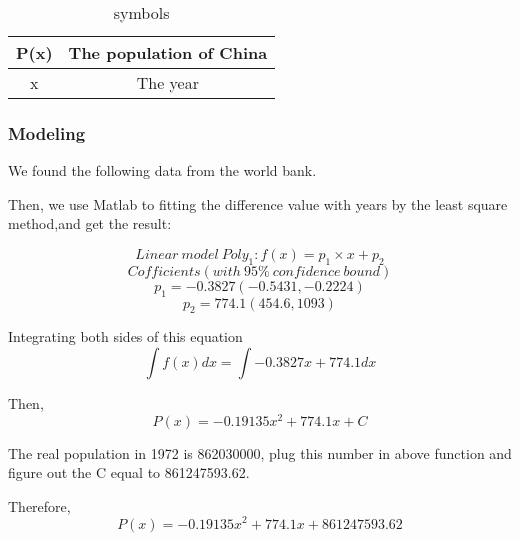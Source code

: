 \documentclass{mcmthesis}
\begin{document}
\begin{table}[!ht]
  \centering
  \begin{tabular}{ c | c }
    \hline
    P(x) & The population of China \\ \hline
    x & The year  \\ \hline
  \end{tabular}
  \caption{symbols}
  \label{symbols3}
\end{table}

\subsubsection{Modeling}
We found the following data from the world bank.

\begin{table}[!ht]
  \caption{1972-2012 Mortality and Birth rate in China}
  \label{Mortality and Birth rate}
\end{table}

Then, we use Matlab to fitting the difference value with years by the least square method,and get the result:

$$Linear\ model\ Poly_1: f(x) = p_1 \times x + p_2$$
$$Cofficients(with\ 95\%\  confidence\ bound)$$
$$p_1 = -0.3827(-0.5431, -0.2224)$$
$$p_2 = 774.1(454.6, 1093)$$

Integrating both sides of this equation
$$\int f(x)dx = \int -0.3827x + 774.1dx$$

Then,
$$P(x) = -0.19135x^2 + 774.1x + C$$

The real population in 1972 is 862030000, plug this number in above function and figure out the C equal to 861247593.62.

 Therefore,
 $$P(x) = -0.19135x^2 + 774.1x + 861247593.62$$
\end{document}
